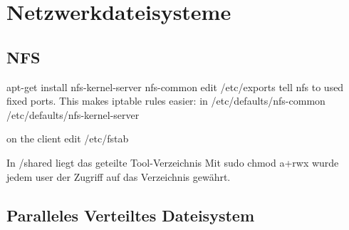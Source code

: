 \chapter{Netzwerkdateisysteme}
\section{NFS}
apt-get install nfs-kernel-server nfs-common
edit /etc/exports
tell nfs to used fixed ports. This makes iptable rules easier:
in /etc/defaults/nfs-common
/etc/defaults/nfs-kernel-server

on the client edit /etc/fstab

In /shared liegt das geteilte Tool-Verzeichnis
Mit sudo chmod a+rwx wurde jedem user der Zugriff auf das Verzeichnis gewährt.

\section{Paralleles Verteiltes Dateisystem}
